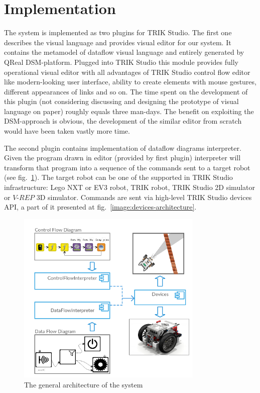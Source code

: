 \documentclass[conference,compsoc]{IEEEtran}
\begin{document}
\section{Implementation}
\label{sec:Implementation}
The system is implemented as two plugins for TRIK Studio. The first one describes the visual language and provides visual editor for our system. It contains the metamodel of dataflow visual language and entirely generated by QReal DSM-platform. Plugged into TRIK Studio this module provides fully operational visual editor with all advantages of TRIK Studio control flow editor like modern-looking user interface, ability to create elements with mouse gestures, different appearances of links and so on. The time spent on the development of this plugin (not considering discussing and designing the prototype of visual language on paper) roughly equals three man-days. The benefit on exploiting the DSM-approach is obvious, the development of the similar editor from scratch would have been taken vastly more time.

The second plugin contains implementation of dataflow diagrams interpreter. Given the program drawn in editor (provided by first plugin) interpreter will transform that program into a sequence of the commands sent to a target robot (see fig.~\ref{image:common-architecture}). The target robot can be one of the supported in TRIK Studio infrastructure: Lego NXT or EV3 robot, TRIK robot, TRIK Studio 2D simulator or $V\mbox{-}REP$ 3D simulator\cite{rohmer2013v}. Commands are sent via high-level TRIK Studio devices API, a part of it presented at fig.~\ref{image:devices-architecture}.

\begin{figure}[ht]
	\centering
	\includegraphics[width=3.5in]{Common.png}
	\caption{The general architecture of the system}
	\label{image:common-architecture}
\end{figure}
\end{document}
